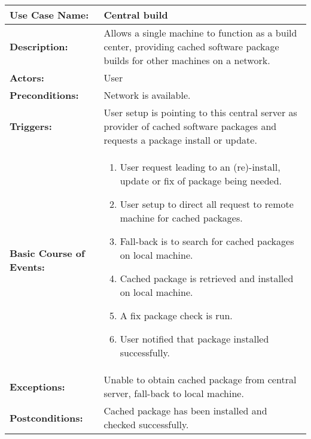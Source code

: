 
\begin{tabularx}{\linewidth}{|l|X|}
\hline
\textbf{Use Case Name:} & \textbf{Central build} \\
\hline
\textbf{Description:} & 
Allows a single machine to function as a build center, providing cached software package
builds for other machines on a network. \\
\hline
\textbf{Actors:} & User \\
\hline
\textbf{Preconditions:} & 
Network is available. \\
\hline
\textbf{Triggers:} & 
User setup is pointing to this central server as provider of cached software packages
and requests a package install or update. \\
\hline
\textbf{Basic Course of Events:} & 
\begin{minipage}{\linewidth} 
  \vspace{0.05em}
  \begin{enumerate}
    \item User request leading to an (re)-install, update or fix of package being needed.
    \item User setup to direct all request to remote machine for cached packages.
    \item Fall-back is to search for cached packages on local machine.
    \item Cached package is retrieved and installed on local machine.
    \item A fix package check is run.
    \item User notified that package installed successfully.
  \end{enumerate}
  \vspace{0.05em}
\end{minipage}
\\
\hline
\textbf{Exceptions:} & 
Unable to obtain cached package from central server, fall-back to local machine. \\
\hline 
\textbf{Postconditions:} &
Cached package has been installed and checked successfully. \\
\hline
\end{tabularx}


